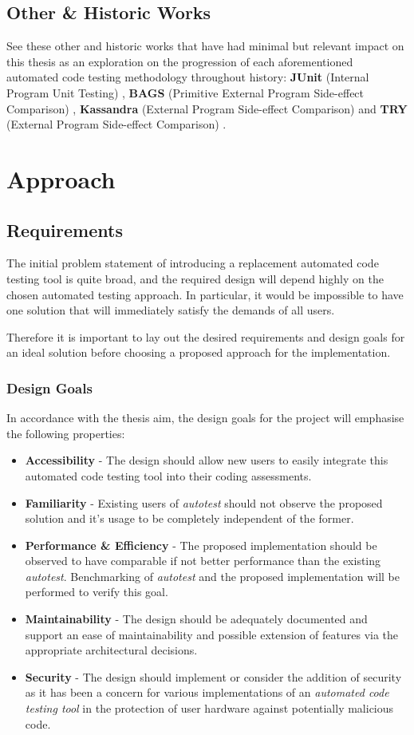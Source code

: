 \documentclass[hidelinks]{report}
\newcommand{\unchapter}[2]{
    \setcounter{chapter}{#1}
    \setcounter{section}{0}
    \chapter*{#2}
    \addcontentsline{toc}{chapter}{#2}
}
\begin{document}
\section{Other \& Historic Works}
See these other and historic works that have had minimal but relevant impact on this thesis as an exploration on the progression of each aforementioned automated code testing methodology throughout history: \textbf{JUnit} (Internal Program Unit Testing) \cite{junit}, \textbf{BAGS} (Primitive External Program Side-effect Comparison) \cite{bags}, \textbf{Kassandra} (External Program Side-effect Comparison) \cite{kassandra} and \textbf{TRY} (External Program Side-effect Comparison) \cite{try}. 

\unchapter{4}{Approach}

\section{Requirements}

The initial problem statement of introducing a replacement automated code testing tool is quite broad, and the required design will depend highly on the chosen automated testing approach. In particular, it would be impossible to have one solution that will immediately satisfy the demands of all users.

Therefore it is important to lay out the desired requirements and design goals for an ideal solution before choosing a proposed approach for the implementation.

\subsection{Design Goals}

In accordance with the thesis aim, the design goals for the project will emphasise the following properties:

\begin{itemize}
	\item \textbf{Accessibility} - The design should allow new users to easily integrate this automated code testing tool into their coding assessments.
	\item \textbf{Familiarity} - Existing users of \textit{autotest} should not observe the proposed solution and it's usage to be completely independent of the former.
	\item \textbf{Performance \& Efficiency} - The proposed implementation should be observed to have comparable if not better performance than the existing \textit{autotest}. Benchmarking of \textit{autotest} and the proposed implementation will be performed to verify this goal.
	\item \textbf{Maintainability} - The design should be adequately documented and support an ease of maintainability and possible extension of features via the appropriate architectural decisions.
	\item \textbf{Security} - The design should implement or consider the addition of security as it has been a concern for various implementations of an \textit{automated code testing tool} in the protection of user hardware against potentially malicious code.
\end{itemize}
\end{document}
